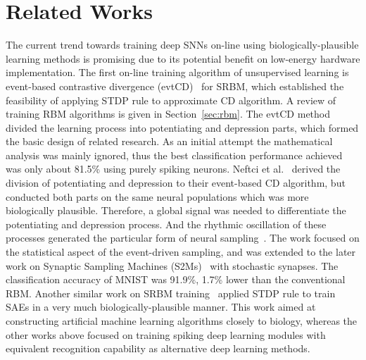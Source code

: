 \section{Related Works}
The current trend towards training deep SNNs on-line using biologically-plausible learning methods is promising due to its potential benefit on low-energy hardware implementation.
The first on-line training algorithm of unsupervised learning is event-based contrastive divergence (evtCD)~\cite{neil2013online} for SRBM, which established the feasibility of applying STDP rule to approximate CD algorithm.
A review of training RBM algorithms is given in Section~\ref{sec:rbm}.
The evtCD method divided the learning process into potentiating and depression parts, which formed the basic design of related research.
As an initial attempt the mathematical analysis was mainly ignored, thus the best classification performance achieved was only about 81.5\% using purely spiking neurons.
Neftci et al.~\cite{neftci2013event} derived the division of potentiating and depression to their event-based CD algorithm, but conducted both parts on the same neural populations which was more biologically plausible.
Therefore, a global signal was needed to differentiate the potentiating and depression process.
And the rhythmic oscillation of these processes generated the particular form of neural sampling~\cite{petrovici2013stochastic}.
The work focused on the statistical aspect of the event-driven sampling, and was extended to the later work on Synaptic Sampling Machines (S2Ms)~\cite{neftci2016stochastic} with stochastic synapses.
The classification accuracy of MNIST was 91.9\%, 1.7\% lower than the conventional RBM.
Another similar work on SRBM training~\cite{burbank2015mirrored} applied STDP rule to train SAEs in a very much biologically-plausible manner.
This work aimed at constructing artificial machine learning algorithms closely to biology, whereas the other works above focused on training spiking deep learning modules with equivalent recognition capability as alternative deep learning methods.

